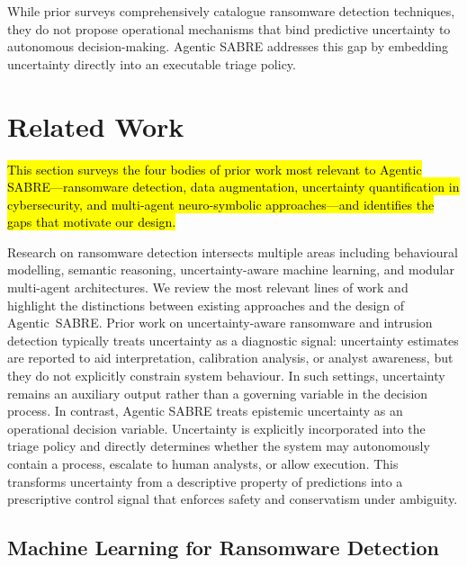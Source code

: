 \documentclass[3p]{elsarticle}
\begin{document}
While prior surveys comprehensively catalogue ransomware detection techniques, they do not propose operational mechanisms that bind predictive uncertainty to autonomous decision-making. Agentic SABRE addresses this gap by embedding uncertainty directly into an executable triage policy.

\section{Related Work}
\label{sec:related}

\hl{This section surveys the four bodies of prior work most relevant to Agentic SABRE---ransomware
detection, data augmentation, uncertainty quantification in cybersecurity, and multi-agent
neuro-symbolic approaches---and identifies the gaps that motivate our design.}

Research on ransomware detection intersects multiple areas including behavioural modelling, semantic reasoning, uncertainty-aware machine learning, and modular multi-agent architectures. We review the most relevant lines of work and highlight the distinctions between existing approaches and the design of Agentic~SABRE. Prior work on uncertainty-aware ransomware and intrusion detection typically treats uncertainty as a diagnostic signal: uncertainty estimates are reported to aid interpretation, calibration analysis, or analyst awareness, but they do not explicitly constrain system behaviour. In such settings, uncertainty remains an auxiliary output rather than a governing variable in the decision process. In contrast, Agentic SABRE treats epistemic uncertainty as an operational decision variable. Uncertainty is explicitly incorporated into the triage policy and directly determines whether the system may autonomously contain a process, escalate to human analysts, or allow execution. This transforms uncertainty from a descriptive property of predictions into a prescriptive control signal that enforces safety and conservatism under ambiguity.

\subsection{Machine Learning for Ransomware Detection}
\end{document}
